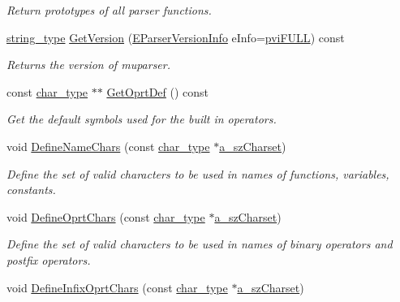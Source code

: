 \begin{DoxyCompactItemize}
\begin{DoxyCompactList}\small\item\em Return prototypes of all parser functions. \end{DoxyCompactList}\item 
\hyperlink{namespacemu_ae9f8b44d9a97dd397180891e8390c3e9}{string\+\_\+type} \hyperlink{classmu_1_1_parser_base_a4b3eac1be699dad4425910eb1428c47b}{Get\+Version} (\hyperlink{namespacemu_abc734ff078c5336d2a379d87537a5789}{E\+Parser\+Version\+Info} e\+Info=\hyperlink{namespacemu_abc734ff078c5336d2a379d87537a5789a15f2fdade93277c8923e2384f184e1af}{pvi\+F\+U\+LL}) const 
\begin{DoxyCompactList}\small\item\em Returns the version of muparser. \end{DoxyCompactList}\item 
const \hyperlink{namespacemu_a81cc89a81a8872430ab1799b5848c5ca}{char\+\_\+type} $\ast$$\ast$ \hyperlink{classmu_1_1_parser_base_a5d1973c228e5b51bb700fbe145cd678c}{Get\+Oprt\+Def} () const 
\begin{DoxyCompactList}\small\item\em Get the default symbols used for the built in operators. \end{DoxyCompactList}\item 
void \hyperlink{classmu_1_1_parser_base_adf259477bbaa85e8dd7cb69ef4aa0a7a}{Define\+Name\+Chars} (const \hyperlink{namespacemu_a81cc89a81a8872430ab1799b5848c5ca}{char\+\_\+type} $\ast$\hyperlink{mu_parser_d_l_l_8h_af2a0f2aed8dce1692e103c958ae233d3}{a\+\_\+sz\+Charset})
\begin{DoxyCompactList}\small\item\em Define the set of valid characters to be used in names of functions, variables, constants. \end{DoxyCompactList}\item 
void \hyperlink{classmu_1_1_parser_base_aafd21c418397d5412a75e5b2c1d6db58}{Define\+Oprt\+Chars} (const \hyperlink{namespacemu_a81cc89a81a8872430ab1799b5848c5ca}{char\+\_\+type} $\ast$\hyperlink{mu_parser_d_l_l_8h_af2a0f2aed8dce1692e103c958ae233d3}{a\+\_\+sz\+Charset})
\begin{DoxyCompactList}\small\item\em Define the set of valid characters to be used in names of binary operators and postfix operators. \end{DoxyCompactList}\item 
void \hyperlink{classmu_1_1_parser_base_ac76d0ceb4ee58babc4f1d0a9ca1e4240}{Define\+Infix\+Oprt\+Chars} (const \hyperlink{namespacemu_a81cc89a81a8872430ab1799b5848c5ca}{char\+\_\+type} $\ast$\hyperlink{mu_parser_d_l_l_8h_af2a0f2aed8dce1692e103c958ae233d3}{a\+\_\+sz\+Charset})
$$
\end{DoxyCompactItemize}
